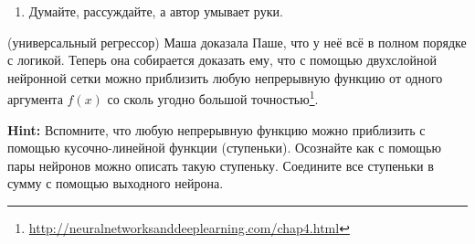 \begin{sol}
\begin{enumerate}
\begin{center}
\end{center}

\item Думайте, рассуждайте, а автор умывает руки.
\end{enumerate} 
\end{sol} 

\begin{problem}{(универсальный регрессор)}
Маша доказала Паше, что у неё всё в полном порядке с логикой. Теперь она собирается доказать ему, что с помощью двухслойной нейронной сетки можно приблизить любую непрерывную функцию от одного аргумента $f(x)$ со сколь угодно большой точностью\footnote{\url{http://neuralnetworksanddeeplearning.com/chap4.html}}.  

\textbf{Hint:}  Вспомните, что любую непрерывную функцию можно приблизить с помощью кусочно-линейной функции (ступеньки). Осознайте как с помощью пары нейронов можно описать такую ступеньку. Соедините все ступеньки в сумму с помощью выходного нейрона. 
\end{problem}

